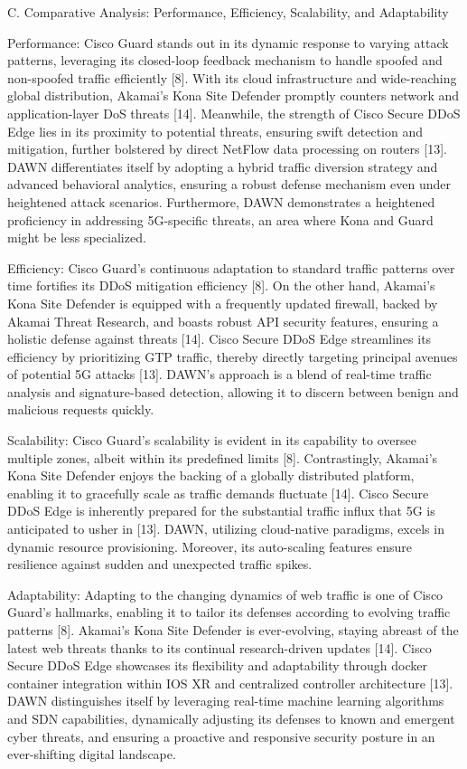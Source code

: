 \documentclass[conference]{IEEEtran}
\begin{document}
C. Comparative Analysis: Performance, Efficiency, Scalability, and Adaptability

Performance:
Cisco Guard stands out in its dynamic response to varying attack patterns, leveraging its closed-loop feedback mechanism to handle spoofed and non-spoofed traffic efficiently [8]. With its cloud infrastructure and wide-reaching global distribution, Akamai's Kona Site Defender promptly counters network and application-layer DoS threats [14]. Meanwhile, the strength of Cisco Secure DDoS Edge lies in its proximity to potential threats, ensuring swift detection and mitigation, further bolstered by direct NetFlow data processing on routers [13]. DAWN differentiates itself by adopting a hybrid traffic diversion strategy and advanced behavioral analytics, ensuring a robust defense mechanism even under heightened attack scenarios. Furthermore, DAWN demonstrates a heightened proficiency in addressing 5G-specific threats, an area where Kona and Guard might be less specialized.

Efficiency:
Cisco Guard's continuous adaptation to standard traffic patterns over time fortifies its DDoS mitigation efficiency [8]. On the other hand, Akamai's Kona Site Defender is equipped with a frequently updated firewall, backed by Akamai Threat Research, and boasts robust API security features, ensuring a holistic defense against threats [14]. Cisco Secure DDoS Edge streamlines its efficiency by prioritizing GTP traffic, thereby directly targeting principal avenues of potential 5G attacks [13]. DAWN's approach is a blend of real-time traffic analysis and signature-based detection, allowing it to discern between benign and malicious requests quickly.

Scalability:
Cisco Guard's scalability is evident in its capability to oversee multiple zones, albeit within its predefined limits [8]. Contrastingly, Akamai's Kona Site Defender enjoys the backing of a globally distributed platform, enabling it to gracefully scale as traffic demands fluctuate [14]. Cisco Secure DDoS Edge is inherently prepared for the substantial traffic influx that 5G is anticipated to usher in [13]. DAWN, utilizing cloud-native paradigms, excels in dynamic resource provisioning. Moreover, its auto-scaling features ensure resilience against sudden and unexpected traffic spikes.

Adaptability:
Adapting to the changing dynamics of web traffic is one of Cisco Guard's hallmarks, enabling it to tailor its defenses according to evolving traffic patterns [8]. Akamai's Kona Site Defender is ever-evolving, staying abreast of the latest web threats thanks to its continual research-driven updates [14]. Cisco Secure DDoS Edge showcases its flexibility and adaptability through docker container integration within IOS XR and centralized controller architecture [13]. DAWN distinguishes itself by leveraging real-time machine learning algorithms and SDN capabilities, dynamically adjusting its defenses to known and emergent cyber threats, and ensuring a proactive and responsive security posture in an ever-shifting digital landscape. 
\end{document}
